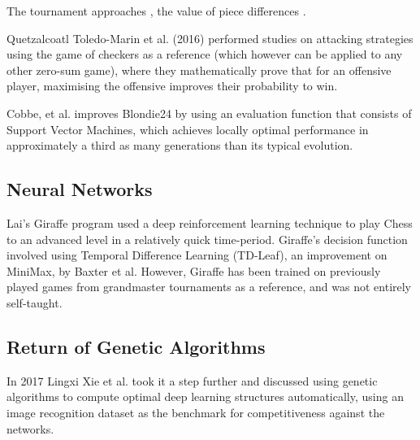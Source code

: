 \documentclass[12pt,a4paper]{article}
\begin{document}
        The tournament approaches \cite{al-khateeb_introducing_2009}, the value of piece differences \cite{al-khateeb_importance_2010}. 
        
        Quetzalcoatl Toledo-Marin et al. (2016) performed studies on attacking strategies using the game of checkers as a reference (which however can be applied to any other zero-sum game), where they mathematically prove that for an offensive player, maximising the offensive improves their probability to win.\cite{toledo-marin_is_2016}

        Cobbe, et al. improves Blondie24 by using an evaluation function that consists of Support Vector Machines, which achieves locally optimal performance in approximately a third as many generations than its typical evolution. \cite{cobbe_accelerating_nodate} 
        
    \subsection{Neural Networks}
        Lai's Giraffe \cite{lai_giraffe:_2015} program used a deep reinforcement learning technique to play Chess to an advanced level in a relatively quick time-period. Giraffe's decision function involved using Temporal Difference Learning (TD-Leaf), an improvement on MiniMax, by Baxter et al. \cite{baxter_tdleaflambda_1999} However, Giraffe has been trained on previously played games from grandmaster tournaments as a reference, and was not entirely self-taught.


    \subsection{Return of Genetic Algorithms}
        In 2017 Lingxi Xie et al. took it a step further and discussed using genetic algorithms to compute optimal deep learning structures automatically, using an image recognition dataset as the benchmark for competitiveness against the networks.\cite{xie_genetic_2017}
\end{document}
